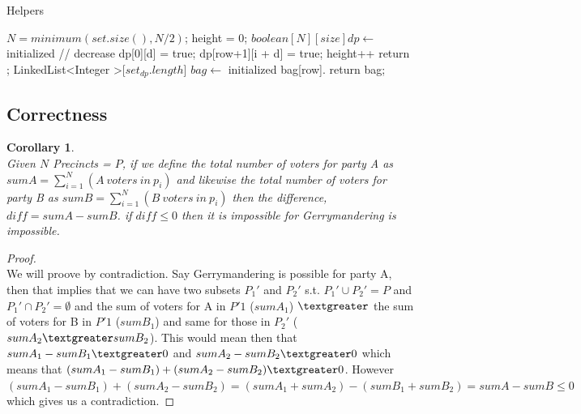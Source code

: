 \documentclass[12pt]{article}
\newtheorem{corollary}[theorem]{Corollary}
\begin{document}
\begin{algorithm}[H]
\caption{Helpers}
\begin{algorithmic}
        \State $N = minimum(set.size(), N/2)$; height = 0;
        \State $boolean[N][size] dp \gets$ initialized
             // decrease
                    \State dp[0][d] = true;
                \Else
                            \State dp[row+1][i + d] = true;
                        \EndIf
                    \EndFor
                \EndIf
                    height++
                \EndIf
            \EndFor
        \EndFor
        \State return ;
    \EndProcedure
        \State LinkedList\textless Integer \textgreater[$set_{dp}.length$] $bag \gets$ initialized
                    \State bag[row].
                \EndIf
            \EndFor
        \EndFor
        \State return bag;
    \EndProcedure
\end{algorithmic}
\end{algorithm}


\subsection{Correctness}
\begin{corollary}
~ \\ \indent Given $N$ Precincts = $P$, if we define the total number of voters for party A as \\
$sumA = \sum_{i=1}^{N} (A\ voters\ in\ p_i)$ and likewise the total number of voters for party B as
$sumB = \sum_{i=1}^{N} (B\ voters\ in\ p_i)$ then the difference, $diff = sumA - sumB$. if $diff \leq 0$
then it is impossible for Gerrymandering is impossible.
\end{corollary}

\begin{proof}
~ \\ \indent We will proove by contradiction. Say Gerrymandering is possible for party A, then that implies that we
can have two subsets $P_1'$ and $P_2'$ s.t. $P_1' \cup P_2' = P$ and $P_1' \cap P_2' = \emptyset$ and the sum of
voters for A in $P'1$ ($sumA_1$) $\textgreater$ the sum of voters for B in $P'1$ ($sumB_1$) and same for those in
$P_2'$ ($sumA_2 \textgreater sumB_2$). This would mean then that $sumA_1 - sumB_1 \textgreater 0$ and
$sumA_2 - sumB_2 \textgreater 0$ which means that $(sumA_1 - sumB_1) + (sumA_2 - sumB_2) \textgreater 0$. However
$(sumA_1 - sumB_1) + (sumA_2 - sumB_2) = (sumA_1 + sumA_2) - (sumB_1 + sumB_2) = sumA - sumB \leq 0$ which gives
us a contradiction.
\end{proof}
\end{document}
